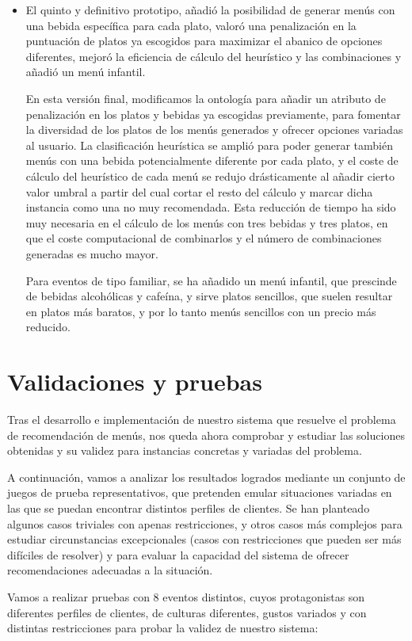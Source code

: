 \documentclass{article}
\begin{document}
\begin{itemize}
    \item El quinto y definitivo prototipo, añadió la posibilidad de generar menús con una bebida específica para cada plato, valoró una penalización en la puntuación de platos ya escogidos para maximizar el abanico de opciones diferentes, mejoró la eficiencia de cálculo del heurístico y las combinaciones y añadió un menú infantil.
    \par
    En esta versión final, modificamos la ontología para añadir un atributo de penalización en los platos y bebidas ya escogidas previamente, para fomentar la diversidad de los platos de los menús generados y ofrecer opciones variadas al usuario. La clasificación heurística se amplió para poder generar también menús con una bebida potencialmente diferente por cada plato, y el coste de cálculo del heurístico de cada menú se redujo drásticamente al añadir cierto valor umbral a partir del cual cortar el resto del cálculo y marcar dicha instancia como una no muy recomendada. Esta reducción de tiempo ha sido muy necesaria en el cálculo de los menús con tres bebidas y tres platos, en que el coste computacional de combinarlos y el número de combinaciones generadas es mucho mayor.
    \par
    Para eventos de tipo familiar, se ha añadido un menú infantil, que prescinde de bebidas alcohólicas y cafeína, y sirve platos sencillos, que suelen resultar en platos más baratos, y por lo tanto menús sencillos con un precio más reducido.
\end{itemize}

\newpage
\section{Validaciones y pruebas}
Tras el desarrollo e implementación de nuestro sistema que resuelve el problema de recomendación de menús, nos queda ahora comprobar y estudiar las soluciones obtenidas y su validez para instancias concretas y variadas del problema.
\par
A continuación, vamos a analizar los resultados logrados mediante un conjunto de juegos de prueba representativos, que pretenden emular situaciones variadas en las que se puedan encontrar distintos perfiles de clientes. Se han planteado algunos casos triviales con apenas restricciones, y otros casos más complejos para estudiar circunstancias excepcionales (casos con restricciones que pueden ser más difíciles de resolver) y para evaluar la capacidad del sistema de ofrecer recomendaciones adecuadas a la situación.
\par
Vamos a realizar pruebas con 8 eventos distintos, cuyos protagonistas son diferentes perfiles de clientes, de culturas diferentes, gustos variados y con distintas restricciones para probar la validez de nuestro sistema:
\end{document}
